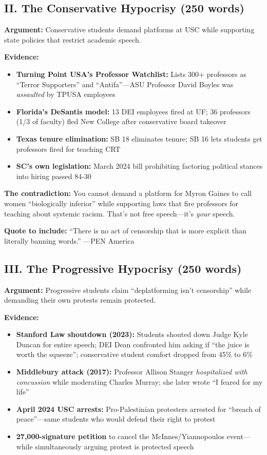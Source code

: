 \documentclass[11pt,letterpaper]{article}
\begin{document}
\subsection{II. The Conservative Hypocrisy (250 words)}

\textbf{Argument:} Conservative students demand platforms at USC while supporting state policies that restrict academic speech.

\textbf{Evidence:}
\begin{itemize}[noitemsep]
    \item \textbf{Turning Point USA's Professor Watchlist:} Lists 300+ professors as ``Terror Supporters'' and ``Antifa''---ASU Professor David Boyles was \textit{assaulted} by TPUSA employees
    \item \textbf{Florida's DeSantis model:} 13 DEI employees fired at UF; 36 professors (1/3 of faculty) fled New College after conservative board takeover
    \item \textbf{Texas tenure elimination:} SB 18 eliminates tenure; SB 16 lets students get professors fired for teaching CRT
    \item \textbf{SC's own legislation:} March 2024 bill prohibiting factoring political stances into hiring passed 84-30
\end{itemize}

\textbf{The contradiction:} You cannot demand a platform for Myron Gaines to call women ``biologically inferior'' while supporting laws that fire professors for teaching about systemic racism. That's not free speech---it's \textit{your} speech.

\textbf{Quote to include:} ``There is no act of censorship that is more explicit than literally banning words.'' ---PEN America

\subsection{III. The Progressive Hypocrisy (250 words)}

\textbf{Argument:} Progressive students claim ``deplatforming isn't censorship'' while demanding their own protests remain protected.

\textbf{Evidence:}
\begin{itemize}[noitemsep]
    \item \textbf{Stanford Law shoutdown (2023):} Students shouted down Judge Kyle Duncan for entire speech; DEI Dean confronted him asking if ``the juice is worth the squeeze''; conservative student comfort dropped from 45\% to 6\%
    \item \textbf{Middlebury attack (2017):} Professor Allison Stanger \textit{hospitalized with concussion} while moderating Charles Murray; she later wrote ``I feared for my life''
    \item \textbf{April 2024 USC arrests:} Pro-Palestinian protesters arrested for ``breach of peace''---same students who would defend their right to protest
    \item \textbf{27,000-signature petition} to cancel the McInnes/Yiannopoulos event---while simultaneously arguing protest is protected speech
\end{itemize}
\end{document}
